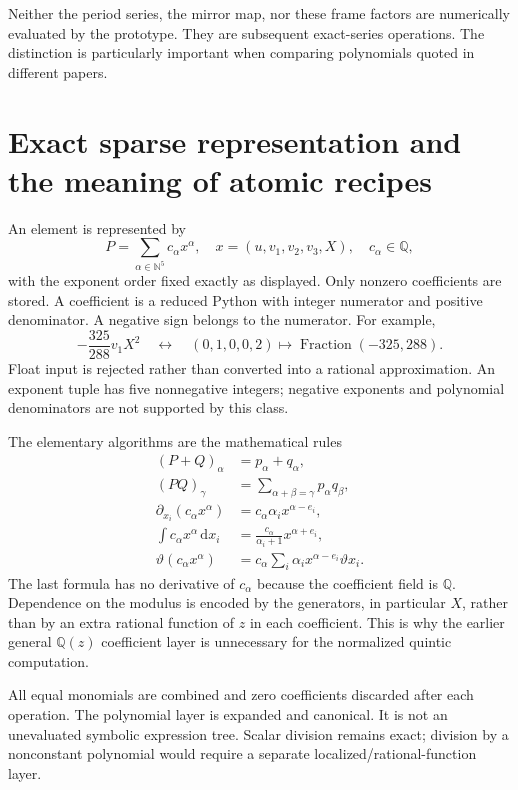 \documentclass[11pt,a4paper]{article}
\numberwithin{equation}{section}
\newcommand{\QQ}{\mathbb Q}
\newcommand{\dd}{\mathrm d}
\newcommand{\tht}{\vartheta}
\newcommand{\del}{\partial}
\newcommand{\code}[1]{\texttt{\detokenize{#1}}}
\begin{document}
Neither the period series, the mirror map, nor these frame factors are
numerically evaluated by the prototype. They are subsequent exact-series
operations. The distinction is particularly important when comparing
polynomials quoted in different papers.

\section{Exact sparse representation and the meaning of atomic recipes}

An element is represented by
\begin{equation}
P=\sum_{\alpha\in\mathbb N^5}c_\alpha x^\alpha,\quad
x=(u,v_1,v_2,v_3,X),\quad c_\alpha\in\QQ,
\end{equation}
with the exponent order fixed exactly as displayed. Only nonzero coefficients
are stored. A coefficient is a reduced Python \code{Fraction} with integer
numerator and positive denominator. A negative sign belongs to the numerator.
For example,
\begin{equation}
-\frac{325}{288}v_1X^2
\quad\longleftrightarrow\quad
(0,1,0,0,2)\mapsto\operatorname{Fraction}(-325,288).
\end{equation}
Float input is rejected rather than converted into a rational approximation.
An exponent tuple has five nonnegative integers; negative exponents and
polynomial denominators are not supported by this class.

The elementary algorithms are the mathematical rules
\begin{align}
(P+Q)_\alpha&=p_\alpha+q_\alpha,\\
(PQ)_\gamma&=\sum_{\alpha+\beta=\gamma}p_\alpha q_\beta,\\
\del_{x_i}(c_\alpha x^\alpha)
 &=c_\alpha\alpha_i x^{\alpha-e_i},\\
\int c_\alpha x^\alpha\,\dd x_i
 &=\frac{c_\alpha}{\alpha_i+1}x^{\alpha+e_i},\\
\tht(c_\alpha x^\alpha)
 &=c_\alpha\sum_i\alpha_i x^{\alpha-e_i}\tht x_i.
\end{align}
The last formula has no derivative of $c_\alpha$ because the coefficient
field is $\QQ$. Dependence on the modulus is encoded by the generators,
in particular $X$, rather than by an extra rational function of $z$ in
each coefficient. This is why the earlier general $\QQ(z)$ coefficient
layer is unnecessary for the normalized quintic computation.

All equal monomials are combined and zero coefficients discarded after
each operation. The polynomial layer is expanded and canonical. It is
not an unevaluated symbolic expression tree. Scalar division remains
exact; division by a nonconstant polynomial would require a separate
localized/rational-function layer.
\end{document}
